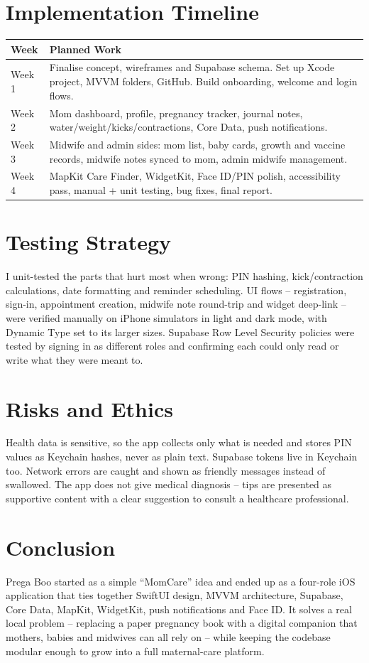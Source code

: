 \documentclass[12pt,a4paper]{article}
\begin{document}
\section{Implementation Timeline}
\begin{longtable}{|p{2.2cm}|p{10.8cm}|}
\hline
\textbf{Week} & \textbf{Planned Work} \\
\hline
Week 1 & Finalise concept, wireframes and Supabase schema. Set up Xcode project, MVVM folders, GitHub. Build onboarding, welcome and login flows. \\
\hline
Week 2 & Mom dashboard, profile, pregnancy tracker, journal notes, water/weight/kicks/contractions, Core Data, push notifications. \\
\hline
Week 3 & Midwife and admin sides: mom list, baby cards, growth and vaccine records, midwife notes synced to mom, admin midwife management. \\
\hline
Week 4 & MapKit Care Finder, WidgetKit, Face ID/PIN polish, accessibility pass, manual + unit testing, bug fixes, final report. \\
\hline
\end{longtable}

\section{Testing Strategy}
I unit-tested the parts that hurt most when wrong: PIN hashing, kick/contraction calculations, date formatting and reminder scheduling. UI flows -- registration, sign-in, appointment creation, midwife note round-trip and widget deep-link -- were verified manually on iPhone simulators in light and dark mode, with Dynamic Type set to its larger sizes. Supabase Row Level Security policies were tested by signing in as different roles and confirming each could only read or write what they were meant to.

\section{Risks and Ethics}
Health data is sensitive, so the app collects only what is needed and stores PIN values as Keychain hashes, never as plain text. Supabase tokens live in Keychain too. Network errors are caught and shown as friendly messages instead of swallowed. The app does not give medical diagnosis -- tips are presented as supportive content with a clear suggestion to consult a healthcare professional.

\section{Conclusion}
Prega Boo started as a simple ``MomCare'' idea and ended up as a four-role iOS application that ties together SwiftUI design, MVVM architecture, Supabase, Core Data, MapKit, WidgetKit, push notifications and Face ID. It solves a real local problem -- replacing a paper pregnancy book with a digital companion that mothers, babies and midwives can all rely on -- while keeping the codebase modular enough to grow into a full maternal-care platform.
\end{document}
